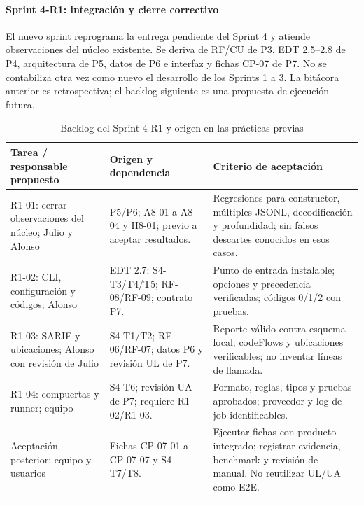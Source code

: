\paragraph*{Sprint 4-R1: integración y cierre correctivo}
El nuevo sprint reprograma la entrega pendiente del Sprint 4 y atiende observaciones del núcleo existente. Se deriva de RF/CU de P3, EDT 2.5--2.8 de P4, arquitectura de P5, datos de P6 e interfaz y fichas CP-07 de P7. No se contabiliza otra vez como nuevo el desarrollo de los Sprints 1 a 3. La bitácora anterior es retrospectiva; el backlog siguiente es una propuesta de ejecución futura.
\begin{table}[H]
\centering\small{}
\caption{Backlog del Sprint 4-R1 y origen en las prácticas previas}
\begin{tabularx}{\textwidth}{P{3.2cm}YY}
\toprule
\textbf{Tarea / responsable propuesto} & \textbf{Origen y dependencia} & \textbf{Criterio de aceptación} \\
\midrule
R1-01: cerrar observaciones del núcleo; Julio y Alonso & P5/P6; A8-01 a A8-04 y H8-01; previo a aceptar resultados. & Regresiones para constructor, múltiples JSONL, decodificación y profundidad; sin falsos descartes conocidos en esos casos. \\
\addlinespace
R1-02: CLI, configuración y códigos; Alonso & EDT 2.7; S4-T3/T4/T5; RF-08/RF-09; contrato P7. & Punto de entrada instalable; opciones y precedencia verificadas; códigos 0/1/2 con pruebas. \\
\addlinespace
R1-03: SARIF y ubicaciones; Alonso con revisión de Julio & S4-T1/T2; RF-06/RF-07; datos P6 y revisión UL de P7. & Reporte válido contra esquema local; codeFlows y ubicaciones verificables; no inventar líneas de llamada. \\
\addlinespace
R1-04: compuertas y runner; equipo & S4-T6; revisión UA de P7; requiere R1-02/R1-03. & Formato, reglas, tipos y pruebas aprobados; proveedor y log de job identificables. \\
\addlinespace
Aceptación posterior; equipo y usuarios & Fichas CP-07-01 a CP-07-07 y S4-T7/T8. & Ejecutar fichas con producto integrado; registrar evidencia, benchmark y revisión de manual. No reutilizar UL/UA como E2E. \\
\addlinespace
\bottomrule
\end{tabularx}
\end{table}
